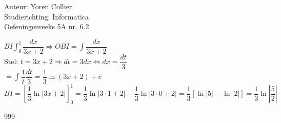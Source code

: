 \documentclass[a4paper]{article}
\newcommand{\asa}{\Leftrightarrow} %
\newcommand{\adR}{\Rightarrow} %
\newcommand{\Lh}{\left(} %
\newcommand{\Rh}{\right)}
\newcommand{\Lv}{\left[} %
\newcommand{\Rv}{\right]}
\newcommand{\Ls}{\left|} %
\newcommand{\Rs}{\right|}
\newcommand{\intgrl}{\displaystyle\int} %
\begin{document}
\noindent \large Auteur: Yoren Collier \\
\noindent \large Studierichting: Informatica\\
\noindent \large Oefeningenreeks 5A nr. 6.2\\

\medskip

\normalsize

$ BI \intgrl_0^1 \dfrac{dx}{3x+2} \adR OBI = \intgrl \dfrac{dx}{3x+2}$\\

Stel: $t = 3x +2 \adR dt = 3dx \asa dx = \dfrac{dt}{3}$\\

$= \intgrl \dfrac{1}{t} \dfrac{dt}{3} = \dfrac{1}{3} \ln \Lh 3x +2 \Rh +c$\\

$BI = \Lv \dfrac{1}{3} \ln \Ls 3x +2 \Rs \Rv_0^1 = \dfrac{1}{3} \ln \Ls 3 \cdot 1 +2 \Rs - \dfrac{1}{3} \ln \Ls 3 \cdot 0 +2 \Rs = \dfrac{1}{3} \Lv \ln \Ls 5 \Rs - \ln \Ls 2 \Rs \Rv = \dfrac{1}{3} \ln \Ls \dfrac{5}{2} \Rs$\\

\begin{thebibliography}{999}
\end{thebibliography}
\end{document}
